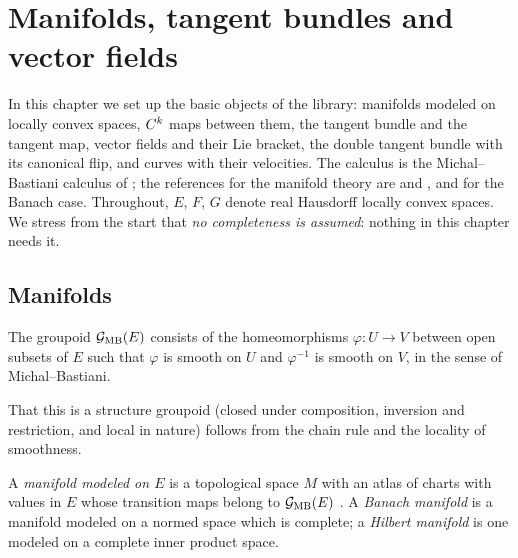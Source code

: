 \chapter{Manifolds, tangent bundles and vector fields}
\label{chap:manifolds}

In this chapter we set up the basic objects of the library: manifolds modeled on locally convex
spaces, $C^{k}$ maps between them, the tangent bundle and the tangent map, vector fields and
their Lie bracket, the double tangent bundle with its canonical flip, and curves with their
velocities. The calculus is the Michal--Bastiani calculus of \cite{LCA}; the references for the
manifold theory are \cite[\S I.3]{Nee06} and \cite[Ch.~3]{GN26}, and \cite{Lan99} for the
Banach case. Throughout, $E$, $F$, $G$ denote real Hausdorff locally convex spaces. We stress
from the start that \emph{no completeness is assumed}: nothing in this chapter needs it.

\section{Manifolds}

\begin{definition}
  \label{def:mb-groupoid}
  \leanok
  The groupoid $\mathcal{G}_{\mathrm{MB}}(E)$ consists of the homeomorphisms $\varphi\colon U \to V$
  between open subsets of $E$ such that $\varphi$ is smooth on $U$ and $\varphi^{-1}$ is smooth
  on $V$, in the sense of Michal--Bastiani.
\end{definition}

That this is a structure groupoid (closed under composition, inversion and restriction, and
local in nature) follows from the chain rule and the locality of smoothness.

\begin{definition}[Manifolds]
  \label{def:mb-manifold}
  \leanok
  A \emph{manifold modeled on $E$} is a topological space $M$ with an atlas of charts with
  values in $E$ whose transition maps belong to $\mathcal{G}_{\mathrm{MB}}(E)$
  \cite[Definition I.3.1]{Nee06}. A \emph{Banach manifold} is a manifold modeled on a normed
  space which is complete; a \emph{Hilbert manifold} is one modeled on a complete inner product
  space.
\end{definition}


